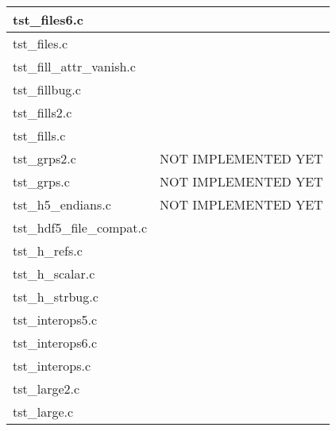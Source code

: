 \begin{table}[H]
\begin{tabular}{|l|l|}
tst\_files6.c   &       \\ \hline
tst\_files.c   &       \\ \hline
tst\_fill\_attr\_vanish.c   &       \\ \hline
tst\_fillbug.c   &       \\ \hline
tst\_fills2.c   &       \\ \hline
tst\_fills.c   &       \\ \hline
tst\_grps2.c   &   NOT IMPLEMENTED YET    \\ \hline
tst\_grps.c   &    NOT IMPLEMENTED YET   \\ \hline
tst\_h5\_endians.c   &   NOT IMPLEMENTED YET    \\ \hline
tst\_hdf5\_file\_compat.c   &       \\ \hline
tst\_h\_refs.c   &       \\ \hline
tst\_h\_scalar.c   &       \\ \hline
tst\_h\_strbug.c   &       \\ \hline
tst\_interops5.c   &       \\ \hline
tst\_interops6.c   &       \\ \hline
tst\_interops.c   &       \\ \hline
tst\_large2.c   &       \\ \hline
tst\_large.c   &       \\ \hline
\end{tabular}
\caption{}
\end{table}

\clearpage

